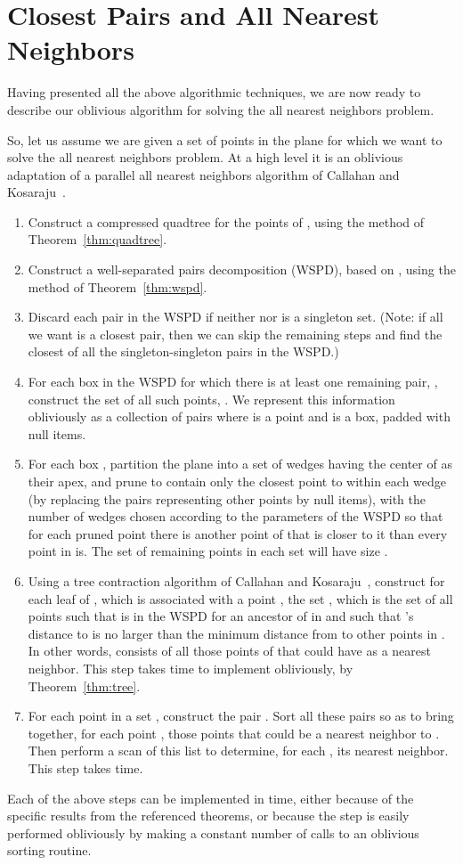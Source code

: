 \documentclass[11pt]{article}
\begin{document}
{\section{Closest Pairs and All Nearest Neighbors}
Having presented all the above algorithmic techniques, we are now
ready to describe our oblivious algorithm for solving the all nearest
neighbors problem.

So, let us assume we are given a set  of  points in the plane
for which we want to solve the all nearest neighbors problem.
At a high level it is an oblivious adaptation of a parallel all
nearest neighbors algorithm of 
Callahan and Kosaraju~\cite{ck-dmpsa-95}.
\begin{enumerate}
\item
Construct a compressed quadtree  for
the points of , using the method of Theorem~\ref{thm:quadtree}.
\item
Construct a well-separated pairs decomposition (WSPD), based on ,
using the method of Theorem~\ref{thm:wspd}.
\item
Discard each pair  in the WSPD if neither  nor  is a
singleton set.
(Note: if all we want is a closest pair, then we can skip the remaining steps
and find the closest of all the singleton-singleton pairs in the WSPD.)
\item
For each box  in the WSPD for which there is at least one remaining pair,
, construct the set  of all such points, . We represent this information obliviously as a collection of pairs  where  is a point and  is a box, padded with null items.
\item
For each box , partition the plane into a set of  wedges having the center  of  as their apex, and prune  to contain only the closest point to  within each wedge (by replacing the pairs representing other points by null items), with the number of wedges chosen according to the parameters of the WSPD so that for each pruned point there is another point of  that is closer to it than every point in  is. The set of remaining points
in each set  will have size .
\item
Using a tree contraction algorithm of 
Callahan and Kosaraju~\cite{ck-dmpsa-95}, 
construct for each leaf  of , which is
associated with a point , the set , which is the set of 
all points  such that  is in the WSPD for an ancestor of
 in  and such that 's distance to  is no larger than the minimum
distance from  to other points in .
In other words,  consists of all those points of  that
could have  as a nearest neighbor.
This step takes  time to implement obliviously, by
Theorem~\ref{thm:tree}.
\item
For each point  in a set , construct the pair . Sort
all these pairs so as to bring together, for each point , those
points that could be a nearest neighbor to . Then perform a scan
of this list to determine, for each , its nearest neighbor.
This step takes  time.
\end{enumerate}
Each of the above steps can be implemented in  time,
either because of the specific results from the referenced theorems,
or because the step is easily performed obliviously by making a
constant number of calls to an oblivious sorting routine.

}
\end{document}
